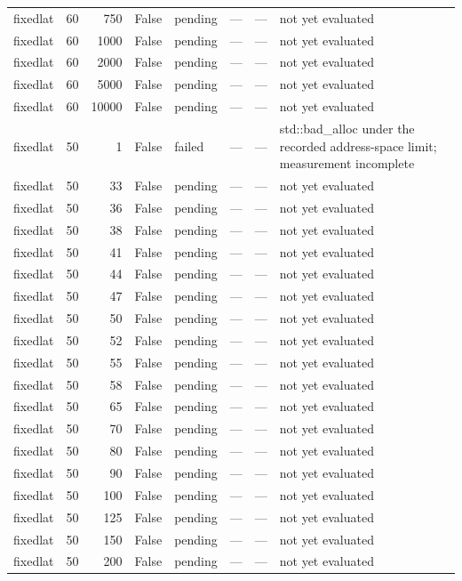 \begin{tabular}{lrrrlrrl}
fixedlat & 60 & 750 & False & pending & — & — & not yet evaluated \\
fixedlat & 60 & 1000 & False & pending & — & — & not yet evaluated \\
fixedlat & 60 & 2000 & False & pending & — & — & not yet evaluated \\
fixedlat & 60 & 5000 & False & pending & — & — & not yet evaluated \\
fixedlat & 60 & 10000 & False & pending & — & — & not yet evaluated \\
fixedlat & 50 & 1 & False & failed & — & — & std::bad\_alloc under the recorded address-space limit; measurement incomplete \\
fixedlat & 50 & 33 & False & pending & — & — & not yet evaluated \\
fixedlat & 50 & 36 & False & pending & — & — & not yet evaluated \\
fixedlat & 50 & 38 & False & pending & — & — & not yet evaluated \\
fixedlat & 50 & 41 & False & pending & — & — & not yet evaluated \\
fixedlat & 50 & 44 & False & pending & — & — & not yet evaluated \\
fixedlat & 50 & 47 & False & pending & — & — & not yet evaluated \\
fixedlat & 50 & 50 & False & pending & — & — & not yet evaluated \\
fixedlat & 50 & 52 & False & pending & — & — & not yet evaluated \\
fixedlat & 50 & 55 & False & pending & — & — & not yet evaluated \\
fixedlat & 50 & 58 & False & pending & — & — & not yet evaluated \\
fixedlat & 50 & 65 & False & pending & — & — & not yet evaluated \\
fixedlat & 50 & 70 & False & pending & — & — & not yet evaluated \\
fixedlat & 50 & 80 & False & pending & — & — & not yet evaluated \\
fixedlat & 50 & 90 & False & pending & — & — & not yet evaluated \\
fixedlat & 50 & 100 & False & pending & — & — & not yet evaluated \\
fixedlat & 50 & 125 & False & pending & — & — & not yet evaluated \\
fixedlat & 50 & 150 & False & pending & — & — & not yet evaluated \\
fixedlat & 50 & 200 & False & pending & — & — & not yet evaluated \\

\end{tabular}
